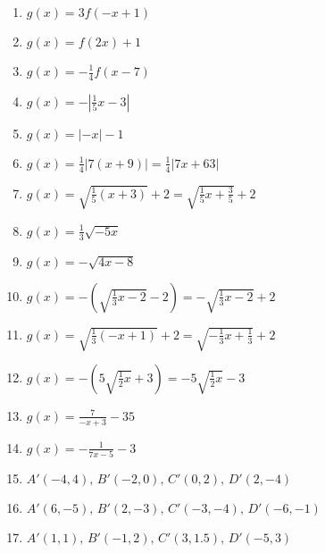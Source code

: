 \begin{enumerate}
	\item $g(x) = 3f(-x+1)$
	\item $g(x) = f(2x)+1$
	\item $g(x) = -\frac{1}{4}f(x-7)$
    \item $g(x) = -\left|\frac{1}{5}x-3\right|$
    \item $g(x) = |-x|-1$
    \item $g(x) = \frac{1}{4}|7(x+9)| = \frac{1}{4}|7x+63|$
    \item $g(x) = \sqrt{\frac{1}{5}(x+3)} + 2 = \sqrt{\frac{1}{5}x + \frac{3}{5}}+2$
    \item $g(x) = \frac{1}{3}\sqrt{-5x}$
    \item $g(x) = -\sqrt{4x-8}$
    \item $g(x) = -\left(\sqrt{\frac{1}{3}x-2}-2\right) = -\sqrt{\frac{1}{3}x-2}+2$
    \item $g(x) = \sqrt{\frac{1}{3}(-x+1)}+2 = \sqrt{-\frac{1}{3}x+\frac{1}{3}}+2$
    \item $g(x) = -\left(5\sqrt{\frac{1}{2}x}+3\right) = -5\sqrt{\frac{1}{2}x} - 3$
    \item $g(x) = \frac{7}{-x+3} - 35$
    \item $g(x) = -\frac{1}{7x-5} - 3$ 
    \item $A'(-4,4), \, B'(-2,0), \, C'(0,2), \, D'(2,-4)$
    \item $A'(6,-5), \, B'(2,-3), \, C'(-3, -4), \, D'(-6,-1)$
    \item $A'(1,1), \, B'(-1,2), \, C'(3,1.5), \, D'(-5,3)$
\end{enumerate}
